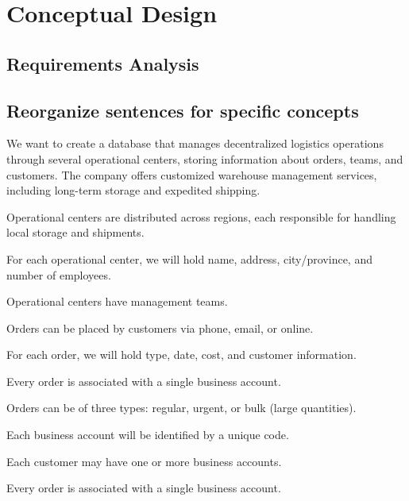 \chapter{Conceptual Design}

\section*{Requirements Analysis}

\section*{Reorganize sentences for specific concepts}


\begin{tcolorbox}[title=General Phrases]
We want to create a database that manages decentralized logistics operations through several operational centers, storing information about orders, teams, and customers. The company offers customized warehouse management services, including long-term storage and expedited shipping.
\end{tcolorbox}

\begin{tcolorbox}[title=Phrases related to Operational Centers]
Operational centers are distributed across regions, each responsible for handling local storage and shipments.  

For each operational center, we will hold name, address, city/province, and number of employees.  

Operational centers have management teams.
\end{tcolorbox}

\begin{tcolorbox}[title=Phrases related to Orders]
Orders can be placed by customers via phone, email, or online.  

For each order, we will hold type, date, cost, and customer information.  

Every order is associated with a single business account.  

Orders can be of three types: regular, urgent, or bulk (large quantities).
\end{tcolorbox}

\begin{tcolorbox}[title=Phrases related to Business Accounts]
Each business account will be identified by a unique code.  

Each customer may have one or more business accounts.  

Every order is associated with a single business account.
\end{tcolorbox}

